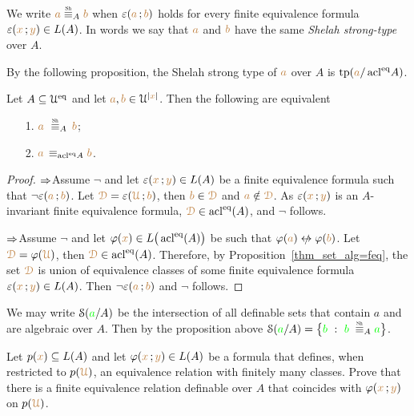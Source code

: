 \documentclass[creche.tex]{subfiles}
\begin{document}
\begin{definition}\label{def_Sh_strong_type}
We write \emph{${\mr a}\stackrel{\smash{\scalebox{.5}{\rm Sh}}}{\equiv}_A{\mr b}$} when $\varepsilon({\color{brown} a}\,;{\color{brown} b})$ holds for every finite equivalence formula $\varepsilon({\color{brown} x}\,;{\color{brown} y})\in L(A)$.
In words we say that ${\color{brown} a}$ and ${\color{brown} b}$ have the same \emph{Shelah strong-type\/} over $A$.\QED
\end{definition}

By the following proposition, the Shelah strong type of ${\color{brown} a}$ over $A$ is ${\rm tp}({\color{brown} a}/\mathop{\rm acl}^{{\rm eq}}\!A)$.


\begin{proposition}\label{prop_Shelah_strong_types}
Let $A\subseteq\EuScript U^{{\rm eq}}$ and let ${\color{brown} a},{\color{brown} b}\in\EuScript U^{|{\color{brown} x}|}$.
Then the following are equivalent\nobreak
\begin{itemize}
\item[1.]  ${\mr a}\ \equivSh_A\, {\mr b}$;
\item[2.]  ${\color{brown} a}\,\equiv_{\mathop{\rm acl}^{{\rm eq}}\! A}{\color{brown} b}$.
\end{itemize} 
\end{proposition}
\begin{proof}
$\Rightarrow$\quad Assume $\neg$ and let $\varepsilon({\color{brown} x}\,;{\color{brown} y})\in L(A)$ be a finite equivalence formula such that $\neg\varepsilon({\color{brown} a}\,;{\color{brown} b})$.
Let ${\color{brown}\EuScript D}=\varepsilon({\color{brown}\EuScript U}\,;{\color{brown} b})$, then  ${\color{brown} b}\in{\color{brown}\EuScript D}$ and ${\color{brown} a}\notin{\color{brown}\EuScript D}$.
As $\varepsilon({\color{brown} x}\,;{\color{brown} y})$ is an $A$-invariant finite equivalence formula, ${\color{brown}\EuScript D}\in\mathop{\rm acl}^{{\rm eq}}(A)$, and $\neg$ follows.


$\Rightarrow$\quad Assume $\neg$ and let $\varphi({\color{brown} x})\in L\big(\mathop{\rm acl}^{{\rm eq}}(A)\big)$ be  such that $\phi({\mr a})\niff\phi({\mr b})$.
Let ${\color{brown}\EuScript D}=\varphi({\color{brown}\EuScript U})$, then ${\color{brown}\EuScript D}\in\mathop{\rm acl}^{{\rm eq}}(A)$.
Therefore, by Proposition~\ref{thm_set_alg=feq}, the set ${\color{brown}\EuScript D}$ is union of equivalence classes of some finite equivalence formula $\varepsilon({\color{brown} x}\,;{\color{brown} y})\in L(A)$.
Then $\neg\varepsilon({\color{brown} a}\,;{\color{brown} b})$ and $\neg$ follows.
\end{proof}

We may write \emph{$\EuScript S({\color{green} a}/A)$\/} be the intersection of all definable sets that contain $a$ and are algebraic over $A$.
Then by the proposition above $\S({\gr a}/A)=\big\{{\gr b}\ :\ {\gr b}\;\equivSh_A {\gr a}\big\}$.


\begin{exercise}
Let $p({\color{brown} x})\subseteq L(A)$ and let $\varphi({\color{brown} x}\,;{\color{brown} y})\in L(A)$ be a formula that defines, when restricted to $p({\color{brown}\EuScript U})$, an equivalence relation with finitely many classes.
Prove that there is a finite equivalence relation definable over $A$ that coincides with $\varphi({\color{brown} x}\,;{\color{brown} y})$ on $p({\color{brown}\EuScript U})$.\QED
\end{exercise}
\end{document}
